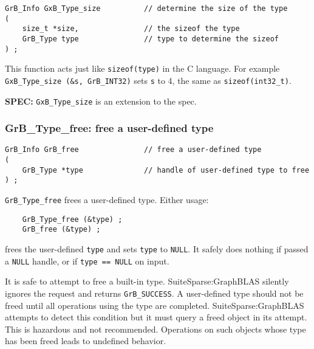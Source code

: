 \documentclass[12pt]{article}
\begin{document}
\begin{mdframed}[userdefinedwidth=6in]
{\footnotesize
\begin{verbatim}
GrB_Info GxB_Type_size          // determine the size of the type
(
    size_t *size,               // the sizeof the type
    GrB_Type type               // type to determine the sizeof
) ;
\end{verbatim}
}\end{mdframed}

This function acts just like \verb'sizeof(type)' in the C language.  For
example \verb'GxB_Type_size (&s, GrB_INT32)' sets \verb's' to 4, the same as
\verb'sizeof(int32_t)'.

\begin{spec}
{\bf SPEC:} \verb'GxB_Type_size' is an extension to the spec.
\end{spec}

\subsubsection{{\sf GrB\_Type\_free:} free a user-defined type}
\label{type_free}

\begin{mdframed}[userdefinedwidth=6in]
{\footnotesize
\begin{verbatim}
GrB_Info GrB_free               // free a user-defined type
(
    GrB_Type *type              // handle of user-defined type to free
) ;
\end{verbatim}
}\end{mdframed}

\verb'GrB_Type_free' frees a user-defined type.
Either usage:

    {\small
    \begin{verbatim}
    GrB_Type_free (&type) ;
    GrB_free (&type) ; \end{verbatim}}

\noindent
frees the user-defined \verb'type' and
sets \verb'type' to \verb'NULL'.
It safely does nothing if passed a \verb'NULL'
handle, or if \verb'type == NULL' on input.

It is safe to attempt to free a built-in type.  SuiteSparse:GraphBLAS silently
ignores the request and returns \verb'GrB_SUCCESS'.  A user-defined type should
not be freed until all operations using the type are completed.
SuiteSparse:GraphBLAS attempts to detect this condition but it must query a
freed object in its attempt.  This is hazardous and not recommended.
Operations on such objects whose type has been freed leads to undefined
behavior.
\end{document}
